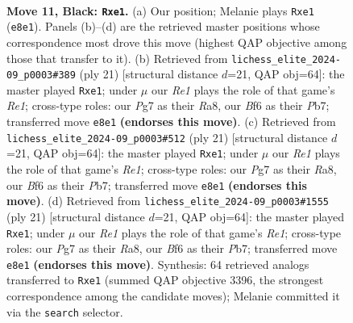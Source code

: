 \documentclass[11pt]{article}
\begin{document}
\begin{figure}[p]\centering
\begin{subfigure}{0.46\textwidth}\centering
\resizebox{\linewidth}{!}{%
\newchessgame
\chessboard[
  setfen={r1bqr1k1/pppp1ppp/3n1b2/3P4/8/8/PPP2PPP/RNBQRBK1 b - - 0 11},
  showmover=false,
  pgfstyle=straightmove, color=movearrow, markmove={e8-e1}
]}
\caption{}
\end{subfigure}\hfill
\begin{subfigure}{0.46\textwidth}\centering
\resizebox{\linewidth}{!}{%
\newchessgame
\chessboard[
  setfen={r1bqr1k1/pppp1ppp/3n1b2/8/3P4/2P5/PP3PPP/RNBQRBK1 b - - 0 11},
  showmover=false,
  pgfstyle=straightmove, color=movearrow, markmove={e8-e1}
]}
\caption{}
\end{subfigure}
\\[4pt]
\begin{subfigure}{0.46\textwidth}\centering
\resizebox{\linewidth}{!}{%
\newchessgame
\chessboard[
  setfen={r1bqr1k1/pppp1ppp/3n1b2/8/3P4/2P5/PP3PPP/RNBQRBK1 b - - 0 11},
  showmover=false,
  pgfstyle=straightmove, color=movearrow, markmove={e8-e1}
]}
\caption{}
\end{subfigure}\hfill
\begin{subfigure}{0.46\textwidth}\centering
\resizebox{\linewidth}{!}{%
\newchessgame
\chessboard[
  setfen={r1bqr1k1/pppp1ppp/3n1b2/8/3P4/2P5/PP3PPP/RNBQRBK1 b - - 0 11},
  showmover=false,
  pgfstyle=straightmove, color=movearrow, markmove={e8-e1}
]}
\caption{}
\end{subfigure}
\caption{\textbf{Move 11, Black: \texttt{Rxe1}.} (a) Our position; Melanie plays \texttt{Rxe1} (\texttt{e8e1}). Panels (b)--(d) are the retrieved master positions whose correspondence most drove this move (highest QAP objective among those that transfer to it). (b) Retrieved from \texttt{lichess\_elite\_2024-09\_p0003\#389} (ply 21) [structural distance $d$=21, QAP obj=64]: the master played \texttt{Rxe1}; under $\mu$ our \emph{Re1} plays the role of that game's \emph{Re1}; cross-type roles: our \emph{P}g7 as their \emph{R}a8, our \emph{B}f6 as their \emph{P}b7; transferred move \texttt{e8e1} \textbf{(endorses this move)}. (c) Retrieved from \texttt{lichess\_elite\_2024-09\_p0003\#512} (ply 21) [structural distance $d$=21, QAP obj=64]: the master played \texttt{Rxe1}; under $\mu$ our \emph{Re1} plays the role of that game's \emph{Re1}; cross-type roles: our \emph{P}g7 as their \emph{R}a8, our \emph{B}f6 as their \emph{P}b7; transferred move \texttt{e8e1} \textbf{(endorses this move)}. (d) Retrieved from \texttt{lichess\_elite\_2024-09\_p0003\#1555} (ply 21) [structural distance $d$=21, QAP obj=64]: the master played \texttt{Rxe1}; under $\mu$ our \emph{Re1} plays the role of that game's \emph{Re1}; cross-type roles: our \emph{P}g7 as their \emph{R}a8, our \emph{B}f6 as their \emph{P}b7; transferred move \texttt{e8e1} \textbf{(endorses this move)}. Synthesis: 64 retrieved analogs transferred to \texttt{Rxe1} (summed QAP objective 3396, the strongest correspondence among the candidate moves); Melanie committed it via the \texttt{search} selector.}
\label{fig:thought-m21}
\end{figure}
\end{document}
